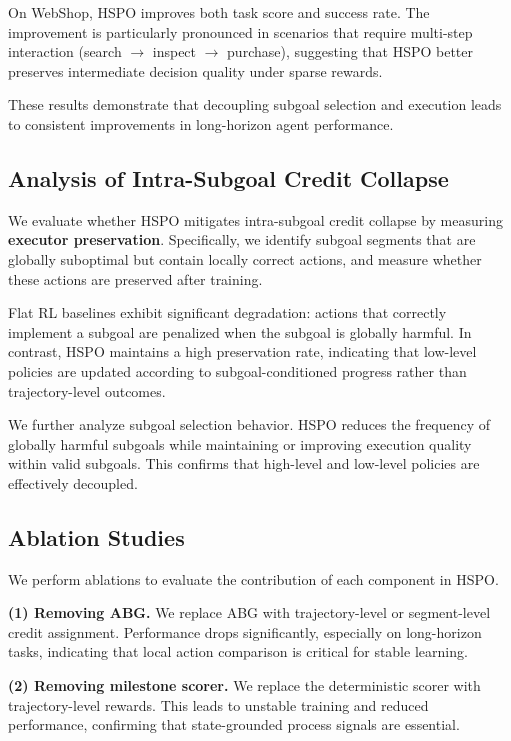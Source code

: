 \documentclass{article}
\begin{document}
On WebShop, HSPO improves both task score and success rate. The improvement is particularly pronounced in scenarios that require multi-step interaction (search $\rightarrow$ inspect $\rightarrow$ purchase), suggesting that HSPO better preserves intermediate decision quality under sparse rewards.

These results demonstrate that decoupling subgoal selection and execution leads to consistent improvements in long-horizon agent performance.

\subsection{Analysis of Intra-Subgoal Credit Collapse}
\label{sec:credit_analysis}

We evaluate whether HSPO mitigates intra-subgoal credit collapse by measuring \textbf{executor preservation}. Specifically, we identify subgoal segments that are globally suboptimal but contain locally correct actions, and measure whether these actions are preserved after training.

Flat RL baselines exhibit significant degradation: actions that correctly implement a subgoal are penalized when the subgoal is globally harmful. In contrast, HSPO maintains a high preservation rate, indicating that low-level policies are updated according to subgoal-conditioned progress rather than trajectory-level outcomes.

We further analyze subgoal selection behavior. HSPO reduces the frequency of globally harmful subgoals while maintaining or improving execution quality within valid subgoals. This confirms that high-level and low-level policies are effectively decoupled.

\subsection{Ablation Studies}
\label{sec:ablation}

We perform ablations to evaluate the contribution of each component in HSPO.

\textbf{(1) Removing ABG.}
We replace ABG with trajectory-level or segment-level credit assignment. Performance drops significantly, especially on long-horizon tasks, indicating that local action comparison is critical for stable learning.

\textbf{(2) Removing milestone scorer.}
We replace the deterministic scorer with trajectory-level rewards. This leads to unstable training and reduced performance, confirming that state-grounded process signals are essential.
\end{document}
